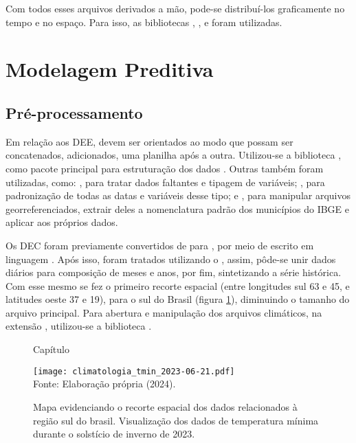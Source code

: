 \indent Com todos esses arquivos derivados a mão, pode-se distribuí-los graficamente no tempo e no espaço. Para isso, as bibliotecas ,  \cite{seaborn_2021_waskom},  e  \cite{geopandas_2020_kelseyjordahl} foram utilizadas.

\section{Modelagem Preditiva}

\subsection{Pré-processamento}

Em relação aos \acrshort{DEE}, devem ser orientados ao modo que possam ser concatenados, adicionados, uma planilha após a outra. Utilizou-se a biblioteca , como pacote principal para estruturação dos dados . Outras também foram utilizadas, como: , para tratar dados faltantes e tipagem de variáveis;  \cite{python2_1995_van}, para padronização de todas as datas e variáveis desse tipo; e , para manipular arquivos georreferenciados, extrair deles a nomenclatura padrão dos municípios do \acrshort{IBGE} e aplicar aos próprios dados.

\indent Os \acrshort{DEC} foram previamente convertidos de  para , por meio de  escrito em linguagem  \cite{shell_1999_heroldlinux, bash_2007_gnu-free}. Após isso, foram tratados utilizando o  \cite{CDO_2023_schulzweida}, assim, pôde-se unir dados diários para composição de meses e anos, por fim, sintetizando a série histórica. Com esse mesmo  se fez o primeiro recorte espacial (entre longitudes sul 63 e 45, e latitudes oeste 37 e 19), para o sul do Brasil (figura \ref{fig: sul_brasil}), diminuindo o tamanho do arquivo principal. Para abertura e manipulação dos arquivos climáticos, na extensão , utilizou-se a biblioteca  \cite{xarray_2016_v0_8_0, xarray_2017_hoyer}.

\begin{figure}[htbp]Capítulo
    \centering
    \caption{Mapa evidenciando o recorte espacial dos dados relacionados à região sul do brasil. Visualização dos dados de temperatura mínima durante o solstício de inverno de 2023.}
    \texttt{[image: climatologia\_tmin\_2023-06-21.pdf]}
    \label{fig: sul_brasil}
    \\
    \vspace{-0.05cm}\hspace{-7.5cm}\small{Fonte: Elaboração própria (2024).} 
\end{figure}

